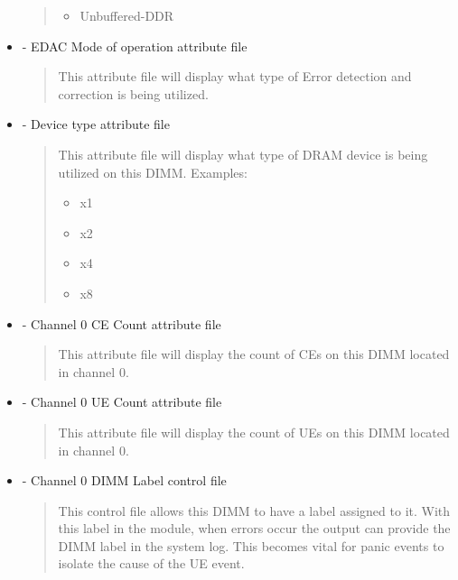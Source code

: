 \documentclass[a4paper,8pt,english]{sphinxmanual}
\begin{document}
\begin{itemize}
\begin{quote}
\begin{itemize}
\item {} 
Unbuffered-DDR

\end{itemize}
\end{quote}

\item {} 
 - EDAC Mode of operation attribute file
\begin{quote}

This attribute file will display what type of Error detection
and correction is being utilized.
\end{quote}

\item {} 
 - Device type attribute file
\begin{quote}

This attribute file will display what type of DRAM device is
being utilized on this DIMM.
Examples:
\begin{itemize}
\item {} 
x1

\item {} 
x2

\item {} 
x4

\item {} 
x8

\end{itemize}
\end{quote}

\item {} 
 - Channel 0 CE Count attribute file
\begin{quote}

This attribute file will display the count of CEs on this
DIMM located in channel 0.
\end{quote}

\item {} 
 - Channel 0 UE Count attribute file
\begin{quote}

This attribute file will display the count of UEs on this
DIMM located in channel 0.
\end{quote}

\item {} 
 - Channel 0 DIMM Label control file
\begin{quote}

This control file allows this DIMM to have a label assigned
to it. With this label in the module, when errors occur
the output can provide the DIMM label in the system log.
This becomes vital for panic events to isolate the
cause of the UE event.


\end{quote}
\end{itemize}
\end{document}
